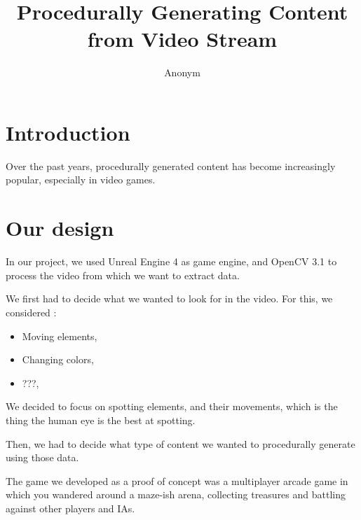 \documentclass[conference]{acmsiggraph}
\title{Procedurally Generating Content from Video Stream}
\author{Anonym}
\begin{document}


\maketitle


\copyrightspace

\section{Introduction}

Over the past years, procedurally generated content has become increasingly popular, especially in video games.

\section{Our design}

In our project, we used Unreal Engine 4 as game engine, and OpenCV 3.1 to process the video from which we want to extract data.

We first had to decide what we wanted to look for in the video.
For this, we considered : 
\begin{itemize}
	\item Moving elements,
	\item Changing colors,
	\item ???,
\end{itemize}

We decided to focus on spotting elements, and their movements, which is the thing the human eye is the best at spotting.

Then, we had to decide what type of content we wanted to procedurally generate using those data.

The game we developed as a proof of concept was a multiplayer arcade game in which you wandered around a maze-ish arena, collecting treasures and battling against other players and IAs.
\end{document}
